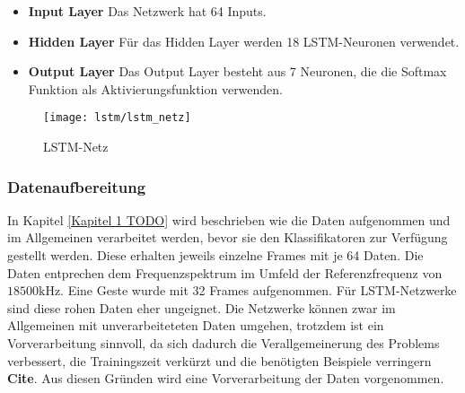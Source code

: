 \begin{itemize}
\item \textbf{Input Layer} Das Netzwerk hat 64 Inputs.
\item \textbf{Hidden Layer} Für das Hidden Layer werden 18 LSTM-Neuronen verwendet.
\item \textbf{Output Layer} Das Output Layer besteht aus 7 Neuronen, die die 
Softmax Funktion als Aktivierungsfunktion verwenden.
\end{itemize}

\begin{figure}[htbp]
    \centering
   \texttt{[image: lstm/lstm\_netz]}
\caption{LSTM-Netz}
\label{fig:lstm_netz}
\end{figure}


\subsubsection{Datenaufbereitung}
\label{sec:lstm_data}

In Kapitel \ref{Kapitel 1 TODO} wird beschrieben wie die Daten aufgenommen und
im Allgemeinen verarbeitet werden, bevor sie den Klassifikatoren zur
Verfügung gestellt werden. Diese erhalten jeweils einzelne Frames mit je 64
Daten. Die Daten entprechen dem Frequenzspektrum im Umfeld der
Referenzfrequenz von $18500\text{kHz}$. Eine Geste wurde mit 32 Frames
aufgenommen. Für \ac{LSTM}-Netzwerke sind diese rohen Daten eher ungeignet. Die
Netzwerke können zwar im Allgemeinen mit unverarbeiteteten Daten umgehen,
trotzdem ist ein Vorverarbeitung sinnvoll, da sich dadurch die Verallgemeinerung
des Problems verbessert, die Trainingszeit verkürzt und die benötigten Beispiele
verringern \textbf{Cite}. Aus diesen Gründen wird eine Vorverarbeitung der Daten
vorgenommen. 

